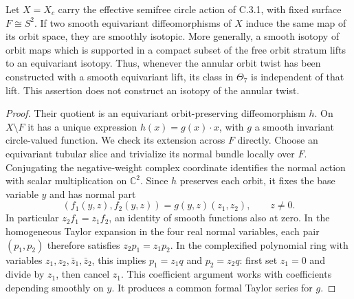 \begin{proposition}
Let \(X=X_c\) carry the effective semifree circle action of C.3.1,
with fixed surface \(F\cong S^2\). If two smooth equivariant
diffeomorphisms of \(X\) induce the same map of its orbit space,
they are smoothly isotopic. More generally, a smooth isotopy of
orbit maps which is supported in a compact subset of the free
orbit stratum lifts to an equivariant isotopy. Thus, whenever the
annular orbit twist has been constructed with a smooth equivariant
lift, its class in \(\Theta_7\) is independent of that lift.
This assertion does not construct an isotopy of the annular twist.
\end{proposition}
\begin{proof}
Their quotient is an equivariant orbit-preserving diffeomorphism
\(h\). On \(X\setminus F\) it has a unique expression
\(h(x)=g(x)\cdot x\), with \(g\) a smooth invariant circle-valued
function. We check its extension across \(F\) directly. Choose an
equivariant tubular slice and trivialize its normal bundle locally
over \(F\). Conjugating the negative-weight complex coordinate
identifies the normal action with scalar multiplication on
\(\mathbb C^2\). Since \(h\) preserves each orbit, it fixes the
base variable \(y\) and has normal part
\[
 (f_1(y,z),f_2(y,z))=g(y,z)(z_1,z_2),\qquad z\ne0.
\]
In particular \(z_2f_1=z_1f_2\), an identity of smooth functions
also at zero. In the homogeneous Taylor expansion in the four real
normal variables, each pair \((p_1,p_2)\) therefore satisfies
\(z_2p_1=z_1p_2\). In the complexified polynomial ring with
variables \(z_1,z_2,\bar z_1,\bar z_2\), this implies
\(p_1=z_1q\) and \(p_2=z_2q\): first set \(z_1=0\) and divide
by \(z_1\), then cancel \(z_1\). This coefficient argument works
with coefficients depending smoothly on \(y\). It produces a
common formal Taylor series for \(g\).


\end{proof}

